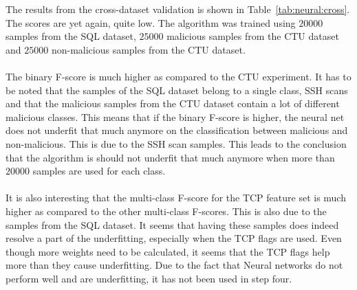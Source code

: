 \noindent The results from the cross-dataset validation is shown in Table~\ref{tab:neural:cross}. The scores are yet again, quite low. The algorithm was trained using $20000$ samples from the SQL dataset, $25000$ malicious samples from the CTU dataset and $25000$ non-malicious samples from the CTU dataset. \\
\\
The binary F-score is much higher as compared to the CTU experiment. It has to be noted that the samples of the SQL dataset belong to a single class, SSH scans and that the malicious samples from the CTU dataset contain a lot of different malicious classes. This means that if the binary F-score is higher, the neural net does not underfit that much anymore on the classification between malicious and non-malicious. This is due to the SSH scan samples. This leads to the conclusion that the algorithm is should not underfit that much anymore when more than $20000$ samples are used for each class. \\
\\
It is also interesting that the multi-class F-score for the TCP feature set is much higher as compared to the other multi-class F-scores. This is also due to the samples from the SQL dataset. It seems that having these samples does indeed resolve a part of the underfitting, especially when the TCP flags are used. Even though more weights need to be calculated, it seems that the TCP flags help more than they cause underfitting. Due to the fact that Neural networks do not perform well and are underfitting, it has not been used in step four. 

